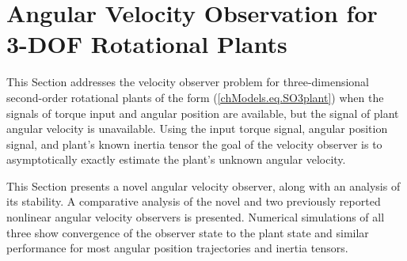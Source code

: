 \section{Angular Velocity Observation for 3-\acs{DOF} Rotational Plants}
\label{chSMS_ID.sec.SO3_velObs}
  
This Section addresses the velocity observer problem for
three-dimensional second-order rotational plants of the form
(\ref{chModels.eq.SO3plant}) when the signals of torque input and
angular position are available, but the signal of plant angular
velocity is unavailable.  Using the input torque signal, angular
position signal, and plant's known inertia tensor the goal of the
velocity observer is to asymptotically exactly estimate the plant's
unknown angular velocity.

This Section presents a novel angular velocity observer, along with an
analysis of its stability. A comparative analysis of the novel and two
previously reported nonlinear angular velocity observers is
presented. Numerical simulations of all three show convergence of the
observer state to the plant state and similar performance for most
angular position trajectories and inertia tensors.





